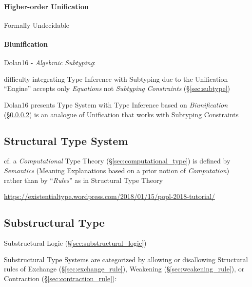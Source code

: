 \paragraph{Higher-order Unification}
\label{sec:higherorder_unification}\hfill

Formally Undecidable



\paragraph{Biunification}\label{sec:biunification}\hfill

Dolan16 - \emph{Algebraic Subtyping}:

difficulty integrating Type Inference with Subtyping due to the
Unification ``Engine'' accepts only \emph{Equations} not
\emph{Subtyping Constraints} (\S\ref{sec:subtype})

Dolan16 presents Type System with Type Inference based on
\emph{Biunification} (\S\ref{sec:biunification}) is an analogue of
Unification that works with Subtyping Constraints



\subsection{Structural Type System}\label{sec:structural_type_system}

cf. a \emph{Computational} Type Theory (\S\ref{sec:computational_type}) is
defined by \emph{Semantics} (Meaning Explanations based on a prior notion of
\emph{Computation}) rather than by ``\emph{Rules}'' as in Structural Type
Theory

\url{https://existentialtype.wordpress.com/2018/01/15/popl-2018-tutorial/}



\subsection{Substructural Type}
\label{sec:substructural_type}

Substructural Logic (\S\ref{sec:substructural_logic})

Substructural Type Systems are categorized by allowing or disallowing
Structural rules of Exchange (\S\ref{sec:exchange_rule}), Weakening
(\S\ref{sec:weakening_rule}), or Contraction
(\S\ref{sec:contraction_rule}):

